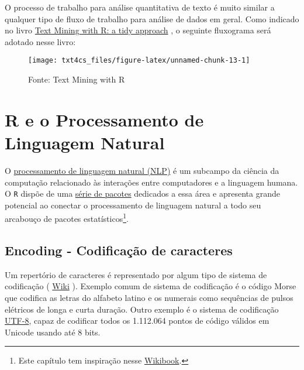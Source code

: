 \documentclass[]{book}
\let\rmarkdownfootnote\footnote%
\def\footnote{\protect\rmarkdownfootnote}
\begin{document}
O processo de trabalho para análise quantitativa de texto é muito similar a qualquer tipo de fluxo de trabalho para análise de dados em geral. Como indicado no livro \href{https://www.tidytextmining.com/topicmodeling.html}{Text Mining with R: a tidy approach} \citep{silge_text_2017}, o seguinte fluxograma será adotado nesse livro:

\begin{figure}

{\centering \texttt{[image: txt4cs\_files/figure-latex/unnamed-chunk-13-1]} 

}

\caption{Fonte: Text Mining with R}\label{fig:unnamed-chunk-13}
\end{figure}

\hypertarget{regex}{%
\chapter{R e o Processamento de Linguagem Natural}\label{regex}}

O \href{https://en.wikipedia.org/wiki/Natural_language_processing}{processamento de linguagem natural (NLP)} é um subcampo da ciência da computação relacionado às interações entre computadores e a linguagem humana. O \texttt{R} dispõe de uma \href{https://cran.r-project.org/web/views/NaturalLanguageProcessing.html}{série de pacotes} dedicados a essa área e apresenta grande potencial ao conectar o processamento de linguagem natural a todo seu arcabouço de pacotes estatísticos\footnote{Este capítulo tem inspiração nesse \href{https://en.wikibooks.org/wiki/R_Programming/Text_Processing}{Wikibook}.}.

\hypertarget{encoding---codificauxe7uxe3o-de-caracteres}{%
\section{Encoding - Codificação de caracteres}\label{encoding---codificauxe7uxe3o-de-caracteres}}

Um repertório de caracteres é representado por algum tipo de sistema de codificação ( \href{https://en.wikipedia.org/wiki/Character_encoding\#cite_note-1}{Wiki} ). Exemplo comum de sistema de codificação é o código Morse que codifica as letras do alfabeto latino e os numerais como sequências de pulsos elétricos de longa e curta duração. Outro exemplo é o sistema de codificação \href{https://en.wikipedia.org/wiki/UTF-8}{UTF-8}, capaz de codificar todos os 1.112.064 pontos de código válidos em Unicode usando até 8 bits.
\end{document}
